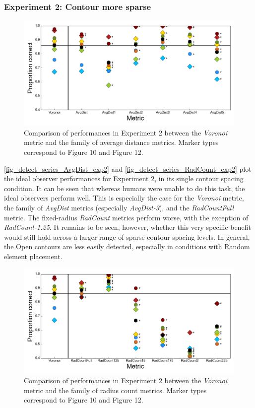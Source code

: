 \documentclass[12pt]{article}
\begin{document}
\subsubsection{Experiment 2: Contour more sparse}

\begin{figure}[h!t]
\includegraphics{Figures/FIG_SUP_detect_series_AvgDist_exp2.png}
\caption{Comparison of performances in Experiment 2 between the \emph{Voronoi} metric and the family of average distance metrics. Marker types correspond to Figure 10 and Figure 12.}
\label{fig_detect_series_AvgDist_exp2}
\end{figure}

\autoref{fig_detect_series_AvgDist_exp2} and \autoref{fig_detect_series_RadCount_exp2} plot the ideal observer performances for Experiment 2, in its single contour spacing condition. It can be seen that whereas humans were unable to do this task, the ideal observers perform well. This is especially the case for the \emph{Voronoi} metric, the family of \emph{AvgDist} metrics (especially \emph{AvgDist-3}), and the \emph{RadCountFull} metric. The fixed-radius \emph{RadCount} metrics perform worse, with the exception of \emph{RadCount-1.25}. It remains to be seen, however, whether this very specific benefit would still hold across a larger range of sparse contour spacing levels. In general, the Open contours are less easily detected, especially in conditions with Random element placement.

\begin{figure}[h!t]
\includegraphics{Figures/FIG_SUP_detect_series_RadCount_exp2.png}
\caption{Comparison of performances in Experiment 2 between the \emph{Voronoi} metric and the family of radius count metrics. Marker types correspond to Figure 10 and Figure 12.}
\label{fig_detect_series_RadCount_exp2}
\end{figure}
\end{document}
